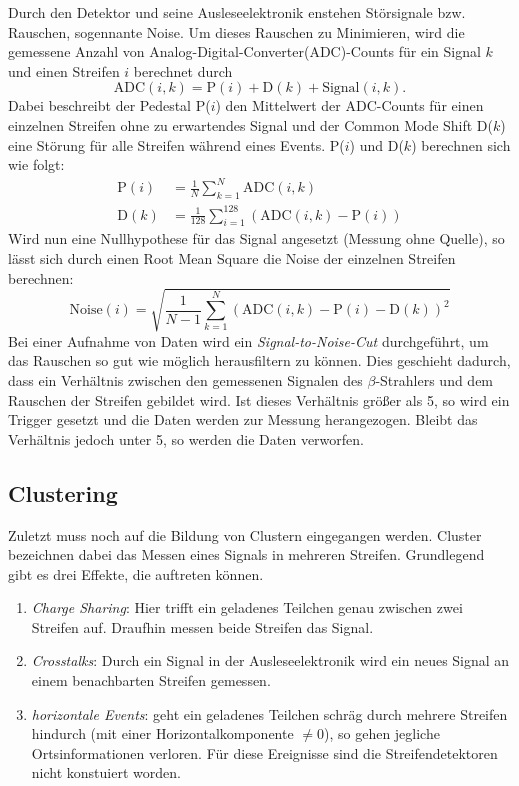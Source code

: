 Durch den Detektor und seine Ausleseelektronik enstehen Störsignale bzw. Rauschen,
sogennante Noise. Um dieses Rauschen zu Minimieren, wird die gemessene Anzahl von
Analog-Digital-Converter(ADC)-Counts für ein Signal $k$ und einen Streifen $i$
berechnet durch
\begin{equation*}
  \text{ADC}(i, k) = \text{P}(i) + \text{D}(k) + \text{Signal}(i, k).
\end{equation*}
Dabei beschreibt der Pedestal P($i$) den Mittelwert der ADC-Counts für einen
einzelnen Streifen ohne zu erwartendes Signal und der Common Mode Shift D($k$)
eine Störung für alle Streifen während eines Events. P($i$) und D($k$) berechnen
sich wie folgt:
\begin{align}
  \text{P}(i) &= \frac{1}{N} \sum_{k=1}^N \text{ADC}(i, k)
  \label{eqn:pedestal} \\
  \text{D}(k) &= \frac{1}{128} \sum_{i=1}^{128} \left(\text{ADC}(i, k) - \text{P}(i) \right)
  \label{eqn:common-mode}
\end{align}
Wird nun eine Nullhypothese für das Signal angesetzt (Messung ohne Quelle),
so lässt sich durch einen Root Mean Square die Noise der einzelnen Streifen berechnen:
\begin{equation}
  \text{Noise}(i) = \sqrt{ \frac{1}{N-1} \sum_{k=1}^N \left(\text{ADC}(i,k) - \text{P} (i) - \text{D}(k)\right)^2 }
  \label{eqn:noise}
\end{equation}
Bei einer Aufnahme von Daten wird ein \textit{Signal-to-Noise-Cut} durchgeführt,
um das Rauschen so gut wie möglich herausfiltern zu können. Dies geschieht
dadurch, dass ein Verhältnis zwischen den gemessenen Signalen des $\beta$-Strahlers
und dem Rauschen der Streifen gebildet wird. Ist dieses Verhältnis größer als 5,
so wird ein Trigger gesetzt und die Daten werden zur Messung herangezogen. Bleibt
das Verhältnis jedoch unter 5, so werden die Daten verworfen.

\subsection{Clustering}
\label{sec:Clustering}
Zuletzt muss noch auf die Bildung von Clustern eingegangen werden. Cluster
bezeichnen dabei das Messen eines Signals in mehreren Streifen. Grundlegend
gibt es drei Effekte, die auftreten können.
\begin{enumerate}
  \item \textit{Charge Sharing}: Hier trifft ein geladenes Teilchen genau
  zwischen zwei Streifen auf. Draufhin messen beide Streifen das Signal.
  \item \textit{Crosstalks}: Durch ein Signal in der Ausleseelektronik wird ein
  neues Signal an einem benachbarten Streifen gemessen.
  \item \textit{horizontale Events}: geht ein geladenes Teilchen schräg durch
  mehrere Streifen hindurch (mit einer Horizontalkomponente $\neq 0$), so gehen
  jegliche Ortsinformationen verloren. Für diese
  Ereignisse sind die Streifendetektoren nicht konstuiert worden.
\end{enumerate}
